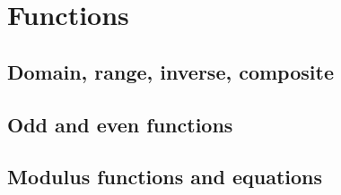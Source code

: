 
\section{Functions}

\subsection{Domain, range, inverse, composite}


\subsection{Odd and even functions}


\subsection{Modulus functions and equations}

